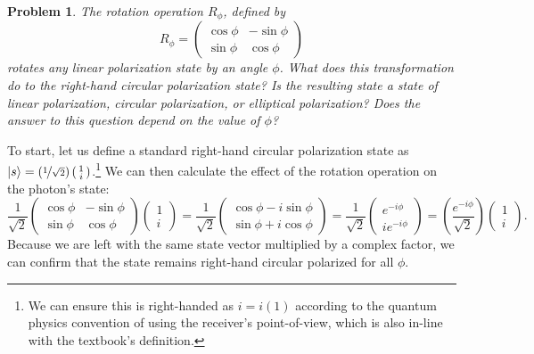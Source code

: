 \documentclass[12pt]{article}
\newenvironment{answer}
    {\begin{adjustwidth}{0pt}{0pt}}
    {\end{adjustwidth}}
\newtheorem{problem}{Problem}
\theoremstyle{remark}  %
\begin{document}
    \begin{problem}
        The rotation operation $R_\phi$, defined by $$R_\phi=\begin{pmatrix}
            \cos\phi & -\sin\phi \\
            \sin\phi & \cos\phi
        \end{pmatrix}$$ rotates any linear polarization state by an angle $\phi$. What does this transformation do to the right-hand circular polarization state? Is the resulting state a state of linear polarization, circular polarization, or elliptical polarization? Does the answer to this question depend on the value of $\phi$?
    \end{problem}
    \begin{answer}
        To start, let us define a standard right-hand circular polarization state as $|s\rangle=(\nicefrac{1}{\sqrt{2}})\left(\begin{smallmatrix}
            1 \\
            i
        \end{smallmatrix}\right)$.\footnote{We can ensure this is right-handed as $i=i(1)$ according to the quantum physics convention of using the receiver's point-of-view, which is also in-line with the textbook's definition.} We can then calculate the effect of the rotation operation on the photon's state:$$\frac{1}{\sqrt{2}}\begin{pmatrix}
            \cos\phi & -\sin\phi \\
            \sin\phi & \cos\phi
        \end{pmatrix}\begin{pmatrix}
            1 \\
            i
        \end{pmatrix} = \frac{1}{\sqrt{2}}\begin{pmatrix}
            \cos\phi - i\sin\phi \\
            \sin\phi + i\cos\phi
        \end{pmatrix} = \frac{1}{\sqrt{2}}\begin{pmatrix}
            e^{-i\phi} \\
            ie^{-i\phi}
        \end{pmatrix} = \left(\frac{e^{-i\phi}}{\sqrt{2}}\right)\begin{pmatrix}
            1 \\
            i
        \end{pmatrix}.$$ Because we are left with the same state vector multiplied by a complex factor, we can confirm that the state remains right-hand circular polarized for all $\phi$.
    \end{answer}
\end{document}
